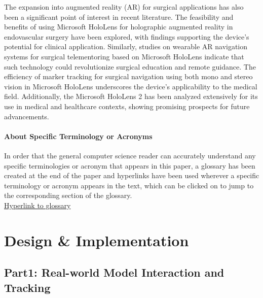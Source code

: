 \documentclass[12pt]{article}
\begin{document}
The expansion into augmented reality (AR) for surgical applications has also been a significant point of interest in recent literature. The feasibility and benefits of using Microsoft HoloLens for holographic augmented reality in endovascular surgery have been explored, with findings supporting the device’s potential for clinical application\cite{Mialhe2021FeasibilityOT}. Similarly, studies on wearable AR navigation systems for surgical telementoring based on Microsoft HoloLens indicate that such technology could revolutionize surgical education and remote guidance\cite{Liu2020AWA}. The efficiency of marker tracking for surgical navigation using both mono and stereo vision in Microsoft HoloLens underscores the device’s applicability to the medical field\cite{Thabit2022EvaluationOM}. Additionally, the Microsoft HoloLens 2 has been analyzed extensively for its use in medical and healthcare contexts, showing promising prospects for future advancements\cite{Palumbo2022MicrosoftH2}. 

\paragraph{About Specific Terminology or Acronyms}

In order that the general computer science reader can accurately understand any specific terminologies or acronym that appears in this paper, a glossary has been created at the end of the paper and hyperlinks have been used wherever a specific terminology  or acronym appears in the text, which can be clicked on to jump to the corresponding section of the glossary.
\\
\hyperref[sec:glossary]{Hyperlink to glossary} %
\section{Design \& Implementation}

\subsection{Part1: Real-world Model Interaction and Tracking}
\end{document}
